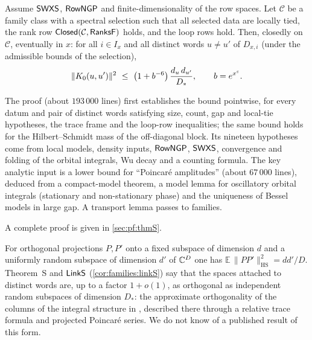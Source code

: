 \begin{theorem}[Theorem S]\Fmark\label{thm:theorem-S}
Assume $\mathsf{SWXS}$, $\mathsf{RowNGP}$ and finite-dimensionality of the row spaces. Let $\mathcal C$ be a
family class with a spectral selection such that all selected data are locally tied, the rank row
$\mathsf{Closed}(\mathcal C,\mathsf{RanksF})$ holds, and the loop rows hold. Then, closedly on $\mathcal C$,
eventually in $x$: for all $i\in I_x$ and all distinct words $u\ne u'$ of $D_{x,i}$ (under the admissible
bounds of the selection),
\[
\|K_0(u,u')\|^2\ \le\ \bigl(1+b^{-6}\bigr)\,\frac{d_u\,d_{u'}}{D_*},\qquad b=e^{x^\eps}.
\]
\end{theorem}

\begin{proofoutline}
The proof (about $193\,000$ lines) first establishes the bound pointwise, for every datum and pair of distinct
words satisfying size, count, gap and local-tie hypotheses, the trace frame and the loop-row inequalities; the
same bound holds for the Hilbert--Schmidt mass of the off-diagonal block. Its nineteen hypotheses come from local
models, density inputs, $\mathsf{RowNGP}$, $\mathsf{SWXS}$, convergence and folding of the orbital integrals,
Wu decay and a counting formula. The key analytic input is a lower bound for ``Poincar\'e amplitudes'' (about
$67\,000$ lines), deduced from a compact-model theorem, a model lemma for oscillatory orbital integrals (stationary
and non-stationary phase) and the uniqueness of Bessel models in large gap. A transport lemma passes to families.

A complete proof is given in \cref{sec:pf:thmS}.
\end{proofoutline}

\begin{remark}\label{rem:families:random}
For orthogonal projections $P,P'$ onto a fixed subspace of dimension $d$ and a uniformly random subspace of
dimension $d'$ of $\mathbb{C}^{D}$ one has $\mathbb E\,\|PP'\|_{\mathrm{HS}}^2=dd'/D$. Theorem~S and $\mathsf{LinkS}$
(\cref{cor:families:linkS}) say that the spaces attached to distinct words are, up to a factor $1+o(1)$, as
orthogonal as independent random subspaces of dimension $D_*$: the approximate orthogonality of the columns of
the integral structure in \cite{Announcement2026}, described there through a relative trace formula and projected
Poincar\'e series. We do not know of a published result of this form.
\end{remark}

